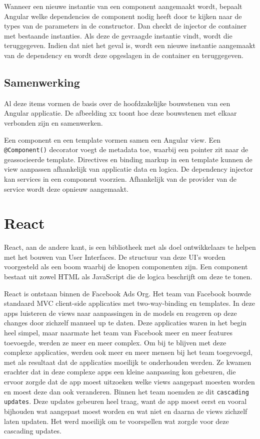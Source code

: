 Wanneer een nieuwe instantie van een component aangemaakt wordt, bepaalt Angular welke dependencies de component nodig heeft door te kijken naar de types van de parameters in de constructor. Dan checkt de injector de container met bestaande instanties. Als deze de gevraagde instantie vindt, wordt die teruggegeven. Indien dat niet het geval is, wordt een nieuwe instantie aangemaakt van de dependency en wordt deze opgeslagen in de container en teruggegeven. \autocite{REFERENCE}

\subsection{Samenwerking}

Al deze items vormen de basis over de hoofdzakelijke bouwstenen van een Angular applicatie. De afbeelding xx toont hoe deze bouwstenen met elkaar verbonden zijn en samenwerken. 

Een component en een template vormen samen een Angular view. Een \texttt{@Component()} decorator voegt de metadata toe, waarbij een pointer zit naar de geassocieerde template. Directives en binding markup in een template kunnen de view aanpassen afhankelijk van applicatie data en logica. De dependency injector kan services in een component voorzien. Afhankelijk van de provider van de service wordt deze opnieuw aangemaakt. \autocite{Angular2019a}



\section{React}

React, aan de andere kant, is een bibliotheek met als doel ontwikkelaars te helpen met het bouwen van User Interfaces. De structuur van deze UI's worden voorgesteld als een boom waarbij de knopen componenten zijn. Een component bestaat uit zowel HTML als JavaScript die de logica beschrijft om deze te tonen. \autocite{Baer2018}

React is ontstaan binnen de Facebook Ads Org. Het team van Facebook bouwde standaard MVC client-side applicaties met two-way-binding en templates. In deze apps luisteren de views naar aanpassingen in de models en reageren op deze changes door zichzelf manueel up te daten. Deze applicaties waren in het begin heel simpel, maar naarmate het team van Facebook meer en meer features toevoegde, werden ze meer en meer complex. Om bij te blijven met deze complexe applicaties, werden ook meer en meer mensen bij het team toegevoegd, met als resultaat dat de applicaties moeilijk te onderhouden werden. Ze kwamen erachter dat in deze complexe apps een kleine aanpassing kon gebeuren, die ervoor zorgde dat de app moest uitzoeken welke views aangepast moesten worden en moest deze dan ook veranderen. Binnen het team noemden ze dit \texttt{cascading updates}. Deze updates gebeuren heel traag, want de app moest eerst en vooral bijhouden wat aangepast moest worden en wat niet en daarna de views zichzelf laten updaten. Het werd moeilijk om te voorspellen wat zorgde voor deze cascading updates. \autocite{Occhino2015}

